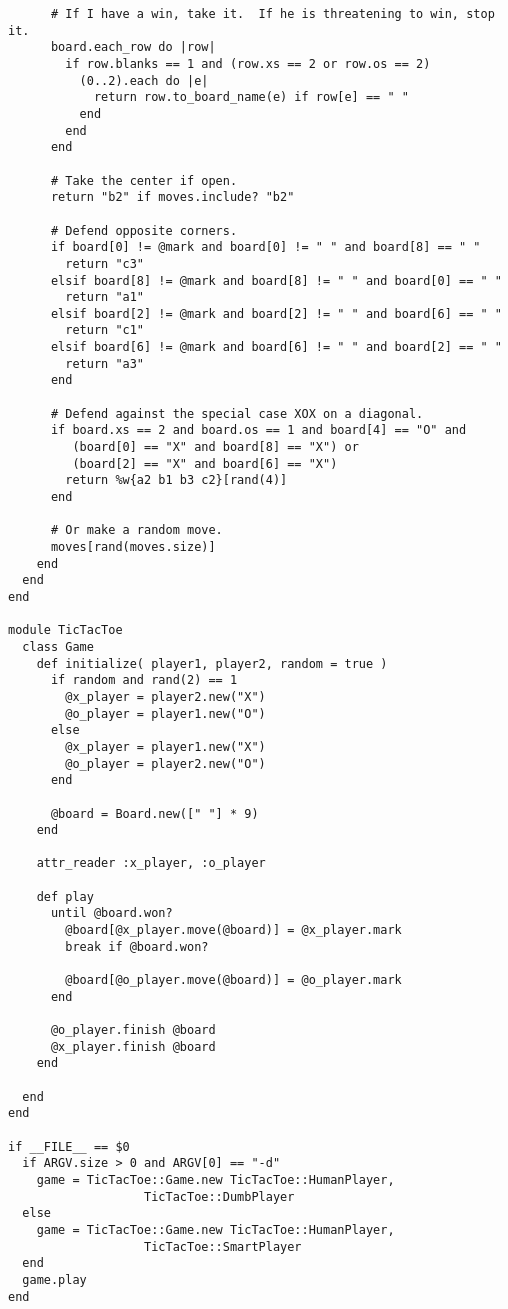 \begin{verbatim}
      # If I have a win, take it.  If he is threatening to win, stop it.
      board.each_row do |row|
        if row.blanks == 1 and (row.xs == 2 or row.os == 2)
          (0..2).each do |e|
            return row.to_board_name(e) if row[e] == " "
          end
        end
      end

      # Take the center if open.
      return "b2" if moves.include? "b2"

      # Defend opposite corners.
      if board[0] != @mark and board[0] != " " and board[8] == " "
        return "c3"
      elsif board[8] != @mark and board[8] != " " and board[0] == " "
        return "a1"
      elsif board[2] != @mark and board[2] != " " and board[6] == " "
        return "c1"
      elsif board[6] != @mark and board[6] != " " and board[2] == " "
        return "a3"
      end
      
      # Defend against the special case XOX on a diagonal.
      if board.xs == 2 and board.os == 1 and board[4] == "O" and
         (board[0] == "X" and board[8] == "X") or
         (board[2] == "X" and board[6] == "X")
        return %w{a2 b1 b3 c2}[rand(4)]
      end
      
      # Or make a random move.
      moves[rand(moves.size)]
    end
  end
end

module TicTacToe
  class Game
    def initialize( player1, player2, random = true )
      if random and rand(2) == 1
        @x_player = player2.new("X")
        @o_player = player1.new("O")
      else
        @x_player = player1.new("X")
        @o_player = player2.new("O")
      end
      
      @board = Board.new([" "] * 9)
    end
    
    attr_reader :x_player, :o_player
    
    def play
      until @board.won?
        @board[@x_player.move(@board)] = @x_player.mark
        break if @board.won?
        
        @board[@o_player.move(@board)] = @o_player.mark
      end
      
      @o_player.finish @board
      @x_player.finish @board
    end
    
  end
end

if __FILE__ == $0
  if ARGV.size > 0 and ARGV[0] == "-d"
    game = TicTacToe::Game.new TicTacToe::HumanPlayer,
                   TicTacToe::DumbPlayer
  else
    game = TicTacToe::Game.new TicTacToe::HumanPlayer,
                   TicTacToe::SmartPlayer
  end
  game.play
end
\end{verbatim}

